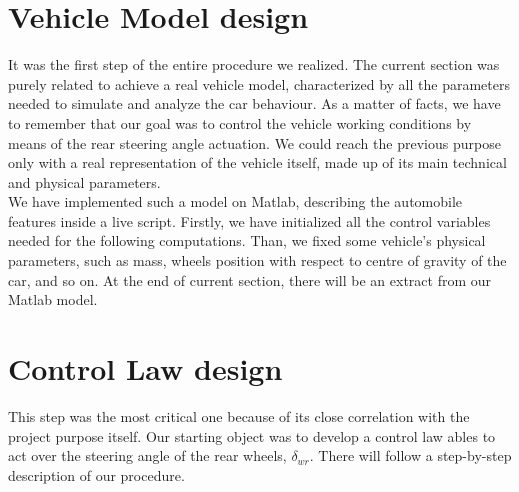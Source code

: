 \documentclass[a4paper,12pt,titlepage]{report}
\numberwithin{figure}{section}
\begin{document}
\section{Vehicle Model design}
It was the first step of the entire procedure we realized. The current section was purely related to achieve a real vehicle model, characterized by all the  parameters needed to simulate and analyze the car behaviour. As a matter of facts, we have to remember that our goal was to control the vehicle working conditions by means of the rear steering angle actuation. We could reach the previous purpose only with a real representation of the vehicle itself, made up of its main technical and physical parameters.\\
We have implemented such a model on Matlab, describing the automobile features inside a live script. Firstly, we have initialized all the control variables needed for the following computations. Than, we fixed some vehicle's physical parameters, such as mass, wheels position with respect to centre of gravity of the car, and so on. At the end of current section, there will be an extract from our Matlab model.
\begin{figure} %
	\centering
\end{figure}
\section{Control Law design}
This step was the most critical one because of its close correlation with the project purpose itself. Our starting object was to develop a control law ables to act over the steering angle of the rear wheels, $\delta_{wr}$. There will follow a step-by-step description of our procedure.
\end{document}
